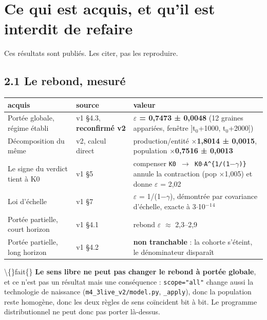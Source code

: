 \documentclass[11pt,a4paper]{article}
\newcommand{\code}[1]{\texttt{#1}}
\begin{document}
\bigskip

\setcounter{section}{1}
\section{Ce qui est acquis, et qu'il est \textbf{interdit} de refaire}

Ces résultats sont publiés. Les citer, pas les reproduire.

\subsection*{2.1 Le rebond, mesuré}

\begin{center}
\begin{tabularx}{\linewidth}{@{}XXX@{}}
\toprule
\textbf{acquis} & \textbf{source} & \textbf{valeur} \\
\midrule
Portée globale, régime établi & v1 §4.3, \textbf{reconfirmé v2} & \textbf{\ensuremath{\varepsilon} = 0,7473 ± 0,0048} (12 graines appariées, fenêtre ]t\ensuremath{_0}+1000, t\ensuremath{_0}+2000]) \\
Décomposition du même & v2, calcul direct & production/entité \textbf{\ensuremath{\times}1,8014 ± 0,0015}, population \textbf{\ensuremath{\times}0,7516 ± 0,0013} \\
Le signe du verdict tient à K0 & v1 §5 & compenser \code{K0 \ensuremath{\rightarrow} K0\ensuremath{\cdot}A\textasciicircum{}\{1/(1\ensuremath{-}\ensuremath{\gamma})\}} annule la contraction (pop \ensuremath{\times}1,005) et donne \ensuremath{\varepsilon} = 2,02 \\
Loi d'échelle & v1 §7 & \ensuremath{\varepsilon} = 1/(1\ensuremath{-}\ensuremath{\gamma}), démontrée par covariance d'échelle, exacte à 3\ensuremath{\cdot}10\ensuremath{^-}\ensuremath{^1}\ensuremath{^{4}} \\
Portée partielle, court horizon & v1 §4.1 & rebond \ensuremath{\varepsilon} \ensuremath{\approx} 2,3--2,9 \\
Portée partielle, long horizon & v1 §4.2 & \textbf{non tranchable} : la cohorte s'éteint, le dénominateur disparaît \\
\bottomrule
\end{tabularx}
\end{center}

\textbackslash\{\}fait\{\} \textbf{Le sens libre ne peut pas changer le rebond à portée globale}, et ce n'est pas un résultat mais une conséquence : \code{scope="all"} change aussi la technologie de naissance (\code{m4\_3live\_v2/model.py}, \code{\_apply}), donc la population reste homogène, donc les deux règles de sens coïncident bit à bit. Le programme distributionnel ne peut donc pas porter là-dessus.
\end{document}
